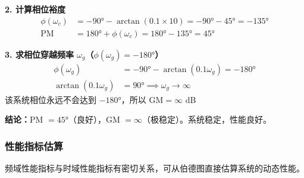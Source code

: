 \textbf{2. 计算相位裕度}
\begin{align*}
\phi(\omega_c) &= -90° - \arctan(0.1 \times 10) = -90° - 45° = -135° \\
\text{PM} &= 180° + \phi(\omega_c) = 180° - 135° = 45°
\end{align*}

\textbf{3. 求相位穿越频率 $\omega_g$（$\phi(\omega_g) = -180°$）}
\begin{align*}
\phi(\omega_g) &= -90° - \arctan(0.1\omega_g) = -180° \\
\arctan(0.1\omega_g) &= 90° \implies \omega_g \to \infty
\end{align*}
该系统相位永远不会达到 $-180°$，所以 $\text{GM} = \infty$ dB

\textbf{结论：}PM $= 45°$（良好），GM $= \infty$（极稳定）。系统稳定，性能良好。

\subsubsection{性能指标估算}

频域性能指标与时域性能指标有密切关系，可从伯德图直接估算系统的动态性能。

